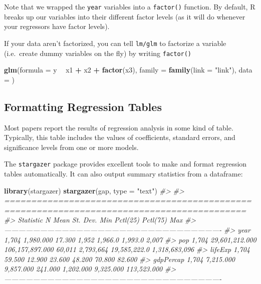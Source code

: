 \documentclass[]{book}
\newenvironment{Shaded}{\begin{snugshade}}{\end{snugshade}}
\newcommand{\KeywordTok}[1]{\textcolor[rgb]{0.13,0.29,0.53}{\textbf{#1}}}
\newcommand{\DataTypeTok}[1]{\textcolor[rgb]{0.13,0.29,0.53}{#1}}
\newcommand{\StringTok}[1]{\textcolor[rgb]{0.31,0.60,0.02}{#1}}
\newcommand{\CommentTok}[1]{\textcolor[rgb]{0.56,0.35,0.01}{\textit{#1}}}
\newcommand{\OperatorTok}[1]{\textcolor[rgb]{0.81,0.36,0.00}{\textbf{#1}}}
\newcommand{\NormalTok}[1]{#1}
\begin{document}
Note that we wrapped the \texttt{year} variables into a
\texttt{factor()} function. By default, R breaks up our variables into
their different factor levels (as it will do whenever your regressors
have factor levels).

If your data aren't factorized, you can tell \texttt{lm/glm} to
factorize a variable (i.e.~create dummy variables on the fly) by writing
\texttt{factor()}

\begin{Shaded}
\begin{Highlighting}[]
\KeywordTok{glm}\NormalTok{(}\DataTypeTok{formula =}\NormalTok{ y }\OperatorTok{~}\StringTok{ }\NormalTok{x1 }\OperatorTok{+}\StringTok{ }\NormalTok{x2 }\OperatorTok{+}\StringTok{ }\KeywordTok{factor}\NormalTok{(x3), }\DataTypeTok{family =} \KeywordTok{family}\NormalTok{(}\DataTypeTok{link =} \StringTok{"link"}\NormalTok{),}
            \DataTypeTok{data =}\NormalTok{ )}
\end{Highlighting}
\end{Shaded}

\subsection{Formatting Regression
Tables}\label{formatting-regression-tables}

Most papers report the results of regression analysis in some kind of
table. Typically, this table includes the values of coefficients,
standard errors, and significance levels from one or more models.

The \texttt{stargazer} package provides excellent tools to make and
format regression tables automatically. It can also output summary
statistics from a dataframe:

\begin{Shaded}
\begin{Highlighting}[]
\KeywordTok{library}\NormalTok{(stargazer)}
\KeywordTok{stargazer}\NormalTok{(gap, }\DataTypeTok{type =} \StringTok{"text"}\NormalTok{)}
\CommentTok{#> }
\CommentTok{#> ===========================================================================================}
\CommentTok{#> Statistic   N        Mean         St. Dev.       Min   Pctl(25)    Pctl(75)        Max     }
\CommentTok{#> -------------------------------------------------------------------------------------------}
\CommentTok{#> year      1,704   1,980.000        17.300       1,952   1,966.0    1,993.0        2,007    }
\CommentTok{#> pop       1,704 29,601,212.000 106,157,897.000 60,011  2,793,664 19,585,222.0 1,318,683,096}
\CommentTok{#> lifeExp   1,704     59.500         12.900      23.600   48.200      70.800       82.600    }
\CommentTok{#> gdpPercap 1,704   7,215.000       9,857.000    241.000 1,202.000  9,325.000    113,523.000 }
\CommentTok{#> -------------------------------------------------------------------------------------------}
\end{Highlighting}
\end{Shaded}
\end{document}
